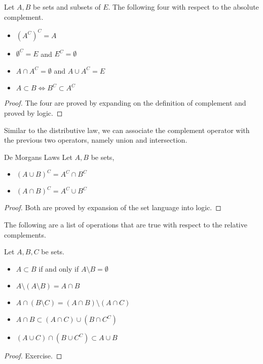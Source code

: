 \begin{prp}{}{} Let $A,B$ be sets and subsets of $E$. The following four with respect to the absolute complement. 
\begin{itemize}
\item $(A^C)^C=A$
\item $\emptyset^C=E$ and $E^C=\emptyset$
\item $A\cap A^C=\emptyset$ and $A\cup A^C=E$
\item $A\subset B\iff B^C\subset A^C$
\end{itemize}\tcbline
\begin{proof} The four are proved by expanding on the definition of complement and proved by logic. 
\end{proof}
\end{prp}

Similar to the distributive law, we can associate the complement operator with the previous two operators, namely union and intersection. 

\begin{thm}{De Morgans Laws}{} Let $A,B$ be sets, 
\begin{itemize}
\item $(A\cup B)^C=A^C\cap B^C$
\item $(A\cap B)^C=A^C\cup B^C$
\end{itemize}\tcbline
\begin{proof} Both are proved by expansion of the set language into logic. 
\end{proof}
\end{thm}

The following are a list of operations that are true with respect to the relative complements. 

\begin{prp}{}{} Let $A,B,C$ be sets. 
\begin{itemize}
\item $A\subset B$ if and only if $A\setminus B=\emptyset$
\item $A\setminus(A\setminus B)=A\cap B$
\item $A\cap (B\setminus C)=(A\cap B)\setminus(A\cap C)$
\item $A\cap B\subset(A\cap C)\cup(B\cap C^C)$
\item $(A\cup C)\cap(B\cup C^C)\subset A\cup B$
\end{itemize}\tcbline
\begin{proof} Exercise. 
\end{proof}
\end{prp}

